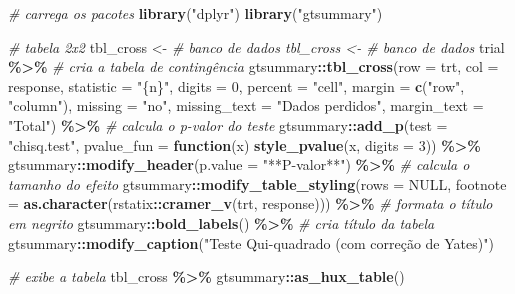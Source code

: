 \documentclass[
  a4paper,
]{book}
\newenvironment{Shaded}{\begin{snugshade}}{\end{snugshade}}
\newcommand{\AttributeTok}[1]{\textcolor[rgb]{0.13,0.29,0.53}{#1}}
\newcommand{\CommentTok}[1]{\textcolor[rgb]{0.56,0.35,0.01}{\textit{#1}}}
\newcommand{\ConstantTok}[1]{\textcolor[rgb]{0.56,0.35,0.01}{#1}}
\newcommand{\ControlFlowTok}[1]{\textcolor[rgb]{0.13,0.29,0.53}{\textbf{#1}}}
\newcommand{\DecValTok}[1]{\textcolor[rgb]{0.00,0.00,0.81}{#1}}
\newcommand{\FunctionTok}[1]{\textcolor[rgb]{0.13,0.29,0.53}{\textbf{#1}}}
\newcommand{\NormalTok}[1]{#1}
\newcommand{\OtherTok}[1]{\textcolor[rgb]{0.56,0.35,0.01}{#1}}
\newcommand{\SpecialCharTok}[1]{\textcolor[rgb]{0.81,0.36,0.00}{\textbf{#1}}}
\newcommand{\StringTok}[1]{\textcolor[rgb]{0.31,0.60,0.02}{#1}}
\begin{document}
\begin{Shaded}
\begin{Highlighting}[]
\CommentTok{\# carrega os pacotes}
\FunctionTok{library}\NormalTok{(}\StringTok{"dplyr"}\NormalTok{)}
\FunctionTok{library}\NormalTok{(}\StringTok{"gtsummary"}\NormalTok{)}

\CommentTok{\# tabela 2x2}
\NormalTok{tbl\_cross }\OtherTok{\textless{}{-}} \CommentTok{\# banco de dados tbl\_cross \textless{}{-} \# banco de dados}
\NormalTok{trial }\SpecialCharTok{\%\textgreater{}\%}
    \CommentTok{\# cria a tabela de contingência}
\NormalTok{gtsummary}\SpecialCharTok{::}\FunctionTok{tbl\_cross}\NormalTok{(}\AttributeTok{row =}\NormalTok{ trt, }\AttributeTok{col =}\NormalTok{ response, }\AttributeTok{statistic =} \StringTok{"\{n\}"}\NormalTok{, }\AttributeTok{digits =} \DecValTok{0}\NormalTok{, }\AttributeTok{percent =} \StringTok{"cell"}\NormalTok{,}
    \AttributeTok{margin =} \FunctionTok{c}\NormalTok{(}\StringTok{"row"}\NormalTok{, }\StringTok{"column"}\NormalTok{), }\AttributeTok{missing =} \StringTok{"no"}\NormalTok{, }\AttributeTok{missing\_text =} \StringTok{"Dados perdidos"}\NormalTok{,}
    \AttributeTok{margin\_text =} \StringTok{"Total"}\NormalTok{) }\SpecialCharTok{\%\textgreater{}\%}
    \CommentTok{\# calcula o p{-}valor do teste}
\NormalTok{gtsummary}\SpecialCharTok{::}\FunctionTok{add\_p}\NormalTok{(}\AttributeTok{test =} \StringTok{"chisq.test"}\NormalTok{, }\AttributeTok{pvalue\_fun =} \ControlFlowTok{function}\NormalTok{(x) }\FunctionTok{style\_pvalue}\NormalTok{(x, }\AttributeTok{digits =} \DecValTok{3}\NormalTok{)) }\SpecialCharTok{\%\textgreater{}\%}
\NormalTok{    gtsummary}\SpecialCharTok{::}\FunctionTok{modify\_header}\NormalTok{(}\AttributeTok{p.value =} \StringTok{"**P{-}valor**"}\NormalTok{) }\SpecialCharTok{\%\textgreater{}\%}
    \CommentTok{\# calcula o tamanho do efeito}
\NormalTok{gtsummary}\SpecialCharTok{::}\FunctionTok{modify\_table\_styling}\NormalTok{(}\AttributeTok{rows =} \ConstantTok{NULL}\NormalTok{, }\AttributeTok{footnote =} \FunctionTok{as.character}\NormalTok{(rstatix}\SpecialCharTok{::}\FunctionTok{cramer\_v}\NormalTok{(trt,}
\NormalTok{    response))) }\SpecialCharTok{\%\textgreater{}\%}
    \CommentTok{\# formata o título em negrito}
\NormalTok{gtsummary}\SpecialCharTok{::}\FunctionTok{bold\_labels}\NormalTok{() }\SpecialCharTok{\%\textgreater{}\%}
    \CommentTok{\# cria título da tabela}
\NormalTok{gtsummary}\SpecialCharTok{::}\FunctionTok{modify\_caption}\NormalTok{(}\StringTok{"Teste Qui{-}quadrado (com correção de Yates)"}\NormalTok{)}

\CommentTok{\# exibe a tabela}
\NormalTok{tbl\_cross }\SpecialCharTok{\%\textgreater{}\%}
\NormalTok{    gtsummary}\SpecialCharTok{::}\FunctionTok{as\_hux\_table}\NormalTok{()}
\end{Highlighting}
\end{Shaded}
\end{document}
